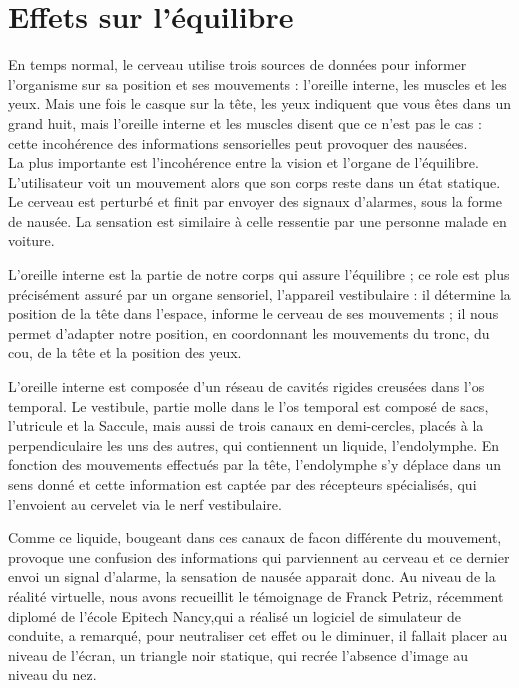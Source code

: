 \documentclass[12pt, a4paper]{report}
\begin{document}
\section{Effets sur l'équilibre}

En temps normal, le cerveau utilise trois sources de données pour informer l'organisme sur sa position et ses mouvements : l'oreille interne, les muscles et les yeux. Mais une fois le casque sur la tête, les yeux indiquent que vous êtes dans un grand huit, mais l'oreille interne et les muscles disent que ce n'est pas le cas : cette incohérence des informations sensorielles peut provoquer des nausées.\\
 La plus importante est l'incohérence entre la vision et  l'organe de l'équilibre. L'utilisateur voit un mouvement alors que son corps reste dans un état statique. Le cerveau est perturbé et finit par envoyer des signaux d'alarmes, sous la forme de nausée. La sensation est similaire à celle ressentie par une personne malade en voiture.

L'oreille interne est la partie de notre corps qui assure l'équilibre ; ce role est plus précisément assuré par un organe sensoriel, l'appareil vestibulaire :
il détermine la position de la tête dans l'espace, informe le cerveau de ses mouvements ; il nous permet d'adapter notre position, en coordonnant les mouvements du tronc, du cou, de la tête et la position des yeux.

L'oreille interne est composée d'un réseau de cavités rigides creusées dans l'os temporal. Le vestibule, partie molle dans le l'os temporal est composé de sacs,  l'utricule  et  la Saccule,  mais aussi de trois canaux en demi-cercles, placés à la perpendiculaire les uns des autres, qui contiennent un liquide, l'endolymphe. En fonction des mouvements effectués par la tête, l'endolymphe s'y déplace dans un sens donné et cette information est captée par des récepteurs spécialisés, qui l'envoient au cervelet via le nerf vestibulaire.

Comme ce liquide, bougeant dans ces canaux de facon différente du mouvement, provoque une confusion des informations qui parviennent au cerveau et ce dernier envoi un signal d'alarme, la sensation de nausée apparait donc.
Au niveau de la réalité virtuelle, nous avons recueillit le témoignage de Franck Petriz, récemment diplomé de l'école Epitech Nancy,qui a réalisé un logiciel de simulateur de conduite, a remarqué, pour neutraliser cet effet ou le diminuer, il fallait placer au niveau de l'écran, un triangle noir statique, qui recrée l'absence d'image au niveau du nez.
\end{document}
